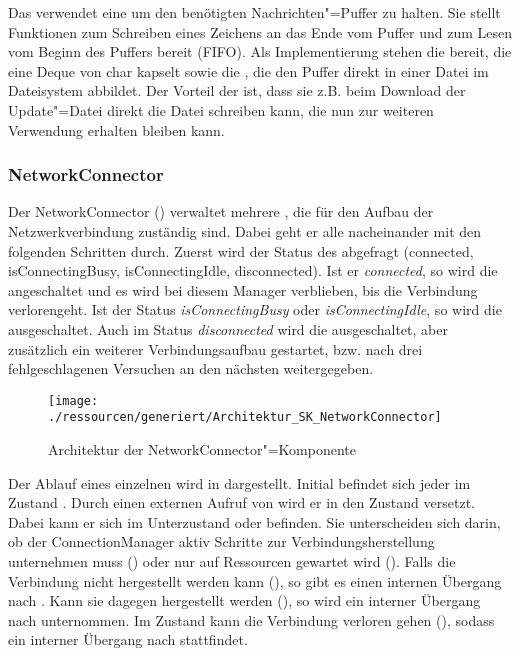 Das  verwendet eine  um den benötigten Nachrichten"=Puffer zu halten.
Sie stellt Funktionen zum Schreiben eines Zeichens an das Ende vom Puffer und zum Lesen vom Beginn des Puffers bereit (FIFO).
Als Implementierung stehen die  bereit, die eine Deque von char kapselt sowie die , die den Puffer direkt in einer Datei im Dateisystem abbildet.
Der Vorteil der  ist, dass sie z.B. beim Download der Update"=Datei direkt die Datei schreiben kann, die nun zur weiteren Verwendung erhalten bleiben kann.

\subsubsection{NetworkConnector}
Der NetworkConnector () verwaltet mehrere , die für den Aufbau der Netzwerkverbindung zuständig sind.
Dabei geht er alle  nacheinander mit den folgenden Schritten durch.
Zuerst wird der Status des  abgefragt (connected, isConnectingBusy, isConnectingIdle, disconnected).
Ist er \textit{connected}, so wird die  angeschaltet und es wird bei diesem Manager verblieben, bis die Verbindung verlorengeht.
Ist der Status \textit{isConnectingBusy} oder \textit{isConnectingIdle}, so wird die  ausgeschaltet.
Auch im Status \textit{disconnected} wird die  ausgeschaltet, aber zusätzlich ein weiterer Verbindungsaufbau gestartet, bzw. nach drei fehlgeschlagenen Versuchen an den nächsten  weitergegeben.

\begin{figure}[!htb]
    \centering
    \texttt{[image: ./ressourcen/generiert/Architektur\_SK\_NetworkConnector]}
    \caption{Architektur der NetworkConnector"=Komponente}
    \label{fig:Architektur_SK_NetworkConnector}
\end{figure}

Der Ablauf eines einzelnen  wird in  dargestellt.
Initial befindet sich jeder  im Zustand .
Durch einen externen Aufruf von  wird er in den Zustand  versetzt.
Dabei kann er sich im Unterzustand  oder  befinden.
Sie unterscheiden sich darin, ob der ConnectionManager aktiv Schritte zur Verbindungsherstellung unternehmen muss () oder nur auf Ressourcen gewartet wird ().
Falls die Verbindung nicht hergestellt werden kann (), so gibt es einen internen Übergang nach .
Kann sie dagegen hergestellt werden (), so wird ein interner Übergang nach  unternommen.
Im Zustand  kann die Verbindung verloren gehen (), sodass ein interner Übergang nach  stattfindet.

